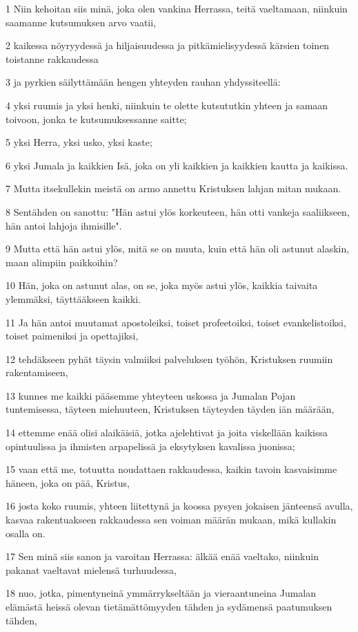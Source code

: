 \par 1 Niin kehoitan siis minä, joka olen vankina Herrassa, teitä vaeltamaan, niinkuin saamanne kutsumuksen arvo vaatii,
\par 2 kaikessa nöyryydessä ja hiljaisuudessa ja pitkämielisyydessä kärsien toinen toistanne rakkaudessa
\par 3 ja pyrkien säilyttämään hengen yhteyden rauhan yhdyssiteellä:
\par 4 yksi ruumis ja yksi henki, niinkuin te olette kutsututkin yhteen ja samaan toivoon, jonka te kutsumuksessanne saitte;
\par 5 yksi Herra, yksi usko, yksi kaste;
\par 6 yksi Jumala ja kaikkien Isä, joka on yli kaikkien ja kaikkien kautta ja kaikissa.
\par 7 Mutta itsekullekin meistä on armo annettu Kristuksen lahjan mitan mukaan.
\par 8 Sentähden on sanottu: "Hän astui ylös korkeuteen, hän otti vankeja saaliikseen, hän antoi lahjoja ihmisille".
\par 9 Mutta että hän astui ylös, mitä se on muuta, kuin että hän oli astunut alaskin, maan alimpiin paikkoihin?
\par 10 Hän, joka on astunut alas, on se, joka myös astui ylös, kaikkia taivaita ylemmäksi, täyttääkseen kaikki.
\par 11 Ja hän antoi muutamat apostoleiksi, toiset profeetoiksi, toiset evankelistoiksi, toiset paimeniksi ja opettajiksi,
\par 12 tehdäkseen pyhät täysin valmiiksi palveluksen työhön, Kristuksen ruumiin rakentamiseen,
\par 13 kunnes me kaikki pääsemme yhteyteen uskossa ja Jumalan Pojan tuntemisessa, täyteen miehuuteen, Kristuksen täyteyden täyden iän määrään,
\par 14 ettemme enää olisi alaikäisiä, jotka ajelehtivat ja joita viskellään kaikissa opintuulissa ja ihmisten arpapelissä ja eksytyksen kavalissa juonissa;
\par 15 vaan että me, totuutta noudattaen rakkaudessa, kaikin tavoin kasvaisimme häneen, joka on pää, Kristus,
\par 16 josta koko ruumis, yhteen liitettynä ja koossa pysyen jokaisen jänteensä avulla, kasvaa rakentuakseen rakkaudessa sen voiman määrän mukaan, mikä kullakin osalla on.
\par 17 Sen minä siis sanon ja varoitan Herrassa: älkää enää vaeltako, niinkuin pakanat vaeltavat mielensä turhuudessa,
\par 18 nuo, jotka, pimentyneinä ymmärrykseltään ja vieraantuneina Jumalan elämästä heissä olevan tietämättömyyden tähden ja sydämensä paatumuksen tähden,
